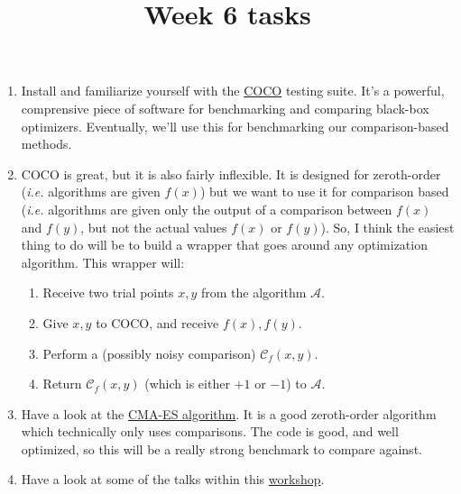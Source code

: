 \documentclass[12pt]{article}
\title{Week 6 tasks}
\begin{document}
\maketitle
\begin{enumerate}

	\item Install and familiarize yourself with the \href{https://github.com/numbbo/coco}{COCO} testing suite. It's a powerful, comprensive piece of software for benchmarking and comparing black-box optimizers. Eventually, we'll use this for benchmarking our comparison-based methods.
	
	\item COCO is great, but it is also fairly inflexible. It is designed for zeroth-order ({\em i.e.} algorithms are given $f(x)$) but we want to use it for comparison based ({\em i.e.} algorithms are given only the output of a comparison between $f(x)$ and $f(y)$, but not the actual values $f(x)$ or $f(y)$). So, I think the easiest thing to do will be to build a wrapper that goes around any optimization algorithm. This wrapper will:
	\begin{enumerate}
		\item Receive two trial points $x,y$ from the algorithm $\mathcal{A}$.
		\item Give $x,y$ to COCO, and receive $f(x),f(y)$.
		\item Perform a (possibly noisy comparison) $\mathcal{C}_{f}(x,y)$.
		\item Return $\mathcal{C}_{f}(x,y)$ (which is either $+1$ or $-1$) to $\mathcal{A}$.
	\end{enumerate} 
	
	\item Have a look at the \href{https://github.com/CMA-ES/pycma}{CMA-ES algorithm}. It is a good zeroth-order algorithm which technically only uses comparisons. The code is good, and well optimized, so this will be a really strong benchmark to compare against. 
	
	\item Have a look at some of the talks within this \href{https://www.icml-hill.com/}{workshop}. 
\end{enumerate}
\end{document}

